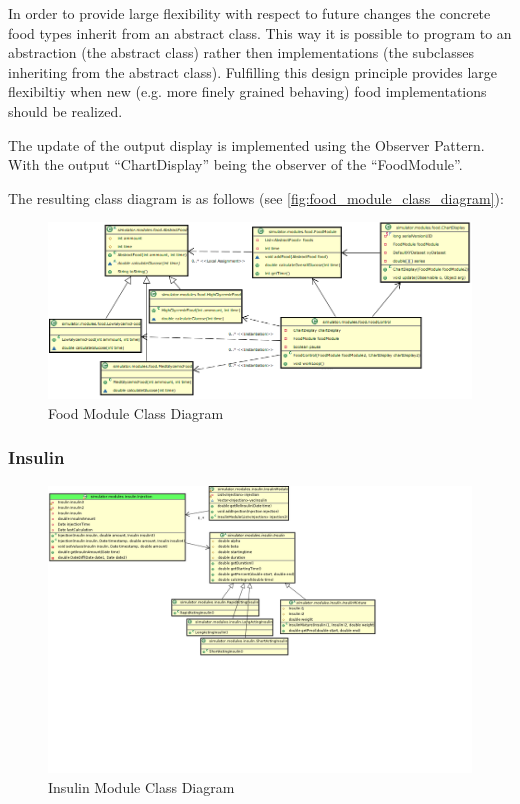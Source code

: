 In order to provide large flexibility with respect to future changes the
concrete food types inherit from an abstract class. This way it is possible to
program to an abstraction (the abstract class) rather then implementations (the
subclasses inheriting from the abstract class).
Fulfilling this design principle provides large flexibiltiy when new (e.g. more
finely grained behaving) food implementations should be realized.

The update of the output display is implemented using the Observer Pattern.
With the output ``ChartDisplay'' being the observer of the ``FoodModule''.

The resulting class diagram is as follows (see
\vref{fig:food_module_class_diagram}):

\begin{figure}[htb]
\centering
\includegraphics[width=\textwidth]{images/food_module_class_diagram2.png}
\caption{Food Module Class Diagram}
\label{fig:food_module_class_diagram}
\end{figure}

\subsubsection{Insulin}

\begin{figure}[htb]
\centering
\includegraphics[width=\textwidth]{images/insulin_class_diagram.png}
\caption{Insulin Module Class Diagram}
\label{fig:insulin_module_class_diagram}
\end{figure}

